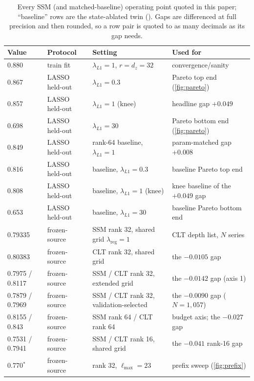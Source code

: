 \begin{table}[t]
  \centering
  \footnotesize
  \caption{Every SSM (and matched-baseline) operating point quoted in this
  paper; ``baseline'' rows are the state-ablated twin
  (). Gaps are differenced at full precision and then
  rounded, so a row pair is quoted to as many decimals as its gap needs.}
  \label{tab:operating}
  \setlength{\tabcolsep}{4pt}
  \begin{tabular}{llll}
    \toprule
    Value & Protocol & Setting & Used for \\
    \midrule
    0.880 & train fit & $\lambda_{L1}{=}1$, $r{=}d_z{=}32$ & convergence/sanity \\
    0.867 & LASSO held-out & $\lambda_{L1}{=}0.3$ & Pareto top end (\cref{fig:pareto}) \\
    0.857 & LASSO held-out & $\lambda_{L1}{=}1$ (knee) & headline gap $+0.049$ \\
    0.698 & LASSO held-out & $\lambda_{L1}{=}30$ & Pareto bottom end (\cref{fig:pareto}) \\
    0.849 & LASSO held-out & rank-64 baseline, $\lambda_{L1}{=}1$ & param-matched gap $+0.008$ \\
    0.816 & LASSO held-out & baseline, $\lambda_{L1}{=}0.3$ & baseline Pareto top end \\
    0.808 & LASSO held-out & baseline, $\lambda_{L1}{=}1$ (knee) & knee baseline of the $+0.049$ gap \\
    0.653 & LASSO held-out & baseline, $\lambda_{L1}{=}30$ & baseline Pareto bottom end \\
    0.79335 & frozen-source & SSM rank 32, shared grid $\lambda_{\mathrm{reg}}{=}1$ & CLT depth list, $N$ series \\
    0.80383 & frozen-source & CLT rank 32, shared grid & the $-0.0105$ gap \\
    0.7975 / 0.8117 & frozen-source & SSM / CLT rank 32, extended grid & the $-0.0142$ gap (axis 1) \\
    0.7879 / 0.7969 & frozen-source & SSM / CLT rank 32, validation-selected & the $-0.0090$ gap ($N{=}1{,}057$) \\
    0.8155 / 0.843 & frozen-source & SSM rank 64 / CLT rank 64 & budget axis; the $-0.027$ gap \\
    0.7531 / 0.7941 & frozen-source & SSM / CLT rank 16, shared grid & the $-0.041$ rank-16 gap \\
    0.770$^{\ast}$ & frozen-source & rank 32, $\ell_{\max}{=}23$ & prefix sweep (\cref{fig:prefix}) \\
    \bottomrule
  \end{tabular}
\end{table}

